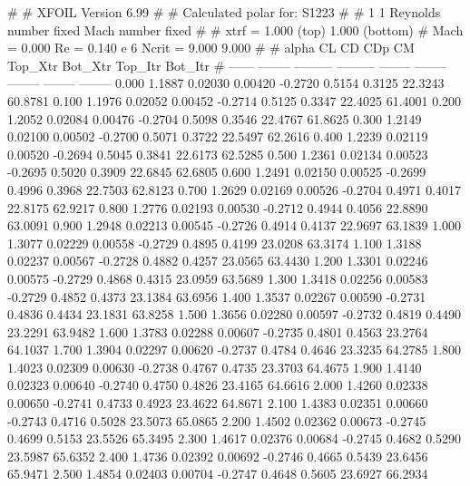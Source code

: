 #  
#       XFOIL         Version 6.99
#  
# Calculated polar for: S1223                                           
#  
# 1 1 Reynolds number fixed          Mach number fixed         
#  
# xtrf =   1.000 (top)        1.000 (bottom)  
# Mach =   0.000     Re =     0.140 e 6     Ncrit =   9.000  9.000
#  
#   alpha    CL        CD       CDp       CM     Top_Xtr  Bot_Xtr  Top_Itr  Bot_Itr
#  ------ -------- --------- --------- -------- -------- -------- -------- --------
   0.000   1.1887   0.02030   0.00420  -0.2720   0.5154   0.3125  22.3243  60.8781
   0.100   1.1976   0.02052   0.00452  -0.2714   0.5125   0.3347  22.4025  61.4001
   0.200   1.2052   0.02084   0.00476  -0.2704   0.5098   0.3546  22.4767  61.8625
   0.300   1.2149   0.02100   0.00502  -0.2700   0.5071   0.3722  22.5497  62.2616
   0.400   1.2239   0.02119   0.00520  -0.2694   0.5045   0.3841  22.6173  62.5285
   0.500   1.2361   0.02134   0.00523  -0.2695   0.5020   0.3909  22.6845  62.6805
   0.600   1.2491   0.02150   0.00525  -0.2699   0.4996   0.3968  22.7503  62.8123
   0.700   1.2629   0.02169   0.00526  -0.2704   0.4971   0.4017  22.8175  62.9217
   0.800   1.2776   0.02193   0.00530  -0.2712   0.4944   0.4056  22.8890  63.0091
   0.900   1.2948   0.02213   0.00545  -0.2726   0.4914   0.4137  22.9697  63.1839
   1.000   1.3077   0.02229   0.00558  -0.2729   0.4895   0.4199  23.0208  63.3174
   1.100   1.3188   0.02237   0.00567  -0.2728   0.4882   0.4257  23.0565  63.4430
   1.200   1.3301   0.02246   0.00575  -0.2729   0.4868   0.4315  23.0959  63.5689
   1.300   1.3418   0.02256   0.00583  -0.2729   0.4852   0.4373  23.1384  63.6956
   1.400   1.3537   0.02267   0.00590  -0.2731   0.4836   0.4434  23.1831  63.8258
   1.500   1.3656   0.02280   0.00597  -0.2732   0.4819   0.4490  23.2291  63.9482
   1.600   1.3783   0.02288   0.00607  -0.2735   0.4801   0.4563  23.2764  64.1037
   1.700   1.3904   0.02297   0.00620  -0.2737   0.4784   0.4646  23.3235  64.2785
   1.800   1.4023   0.02309   0.00630  -0.2738   0.4767   0.4735  23.3703  64.4675
   1.900   1.4140   0.02323   0.00640  -0.2740   0.4750   0.4826  23.4165  64.6616
   2.000   1.4260   0.02338   0.00650  -0.2741   0.4733   0.4923  23.4622  64.8671
   2.100   1.4383   0.02351   0.00660  -0.2743   0.4716   0.5028  23.5073  65.0865
   2.200   1.4502   0.02362   0.00673  -0.2745   0.4699   0.5153  23.5526  65.3495
   2.300   1.4617   0.02376   0.00684  -0.2745   0.4682   0.5290  23.5987  65.6352
   2.400   1.4736   0.02392   0.00692  -0.2746   0.4665   0.5439  23.6456  65.9471
   2.500   1.4854   0.02403   0.00704  -0.2747   0.4648   0.5605  23.6927  66.2934

